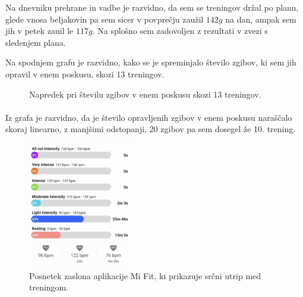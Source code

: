 \documentclass{article}
\begin{document}
Na dnevniku prehrane in vadbe je razvidno, da sem se treningov držal po planu, glede vnosa beljakovin pa sem sicer v povprečju zaužil $142g$ na dan, ampak sem jih v petek zauil le $117g$. Na splošno sem zadovoljen z rezultati v zvezi s sledenjem plana.

Na spodnjem grafu je razvidno, kako se je spreminjalo število zgibov, ki sem jih opravil v enem poskusu, skozi 13 treningov.

\begin{figure}[H]
\centering
\caption{Napredek pri številu zgibov v enem poskusu skozi 13 treningov.}
\end{figure}

\paragraph{}
Iz grafa je razvidno, da je število opravljenih zgibov v enem poskusu naraščalo skoraj linearno, z manjšimi odstopanji, 20 zgibov pa sem dosegel že 10. trening.

\begin{figure}[H]
    \centering
    \includegraphics[width=0.4\textwidth]{figures/srcni-utrip.jpg}
    \caption{Posnetek zaslona aplikacije Mi Fit, ki prikazuje srčni utrip med treningom.} 
    \label{fig:srcni-utrip}
\end{figure}
\end{document}
